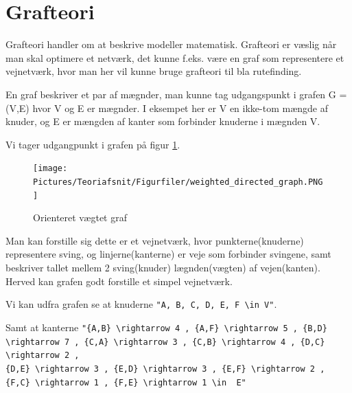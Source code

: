 \section{Grafteori}

Grafteori handler om at beskrive  modeller matematisk. Grafteori er væslig når man skal optimere et netværk, det kunne f.eks. være en graf som representere et vejnetværk, hvor man her vil kunne bruge grafteori til bla rutefinding.  

En graf beskriver et par af mægnder, man kunne tag udgangspunkt i grafen G = (V,E) hvor V og E er mægnder. I eksempet her er V en ikke-tom mængde af knuder, og E er mængden af kanter som forbinder knuderne i mægnden V. 

\vspace{5mm}

Vi tager udgangpunkt i grafen på figur \ref{fig:weighted-directed-graph}.

\begin{figure}[H]
\begin{adjustbox}{width=0.5\textwidth,center=\textwidth}
\centering
\texttt{[image: Pictures/Teoriafsnit/Figurfiler/weighted\_directed\_graph.PNG]}
\end{adjustbox}
\caption{Orienteret vægtet graf}
\label{fig:weighted-directed-graph}
\end{figure}

\vspace{5mm}

Man kan forstille sig dette er et vejnetværk, hvor punkterne(knuderne) representere sving, og linjerne(kanterne) er veje som forbinder svingene, samt beskriver tallet mellem 2 sving(knuder) lægnden(vægten) af vejen(kanten). Herved kan grafen godt forstille et simpel vejnetværk.

\vspace{5mm}

Vi kan udfra grafen se at knuderne \verb!"A, B, C, D, E, F \in V"!. 

\vspace{5mm}

Samt at kanterne \verb!"{A,B} \rightarrow 4 , {A,F} \rightarrow 5 , {B,D} \rightarrow 7 , {C,A} \rightarrow 3 , {C,B} \rightarrow 4 , {D,C} \rightarrow 2 ,! \\
\verb!{D,E} \rightarrow 3 , {E,D} \rightarrow 3 , {E,F} \rightarrow 2 , {F,C} \rightarrow 1 , {F,E} \rightarrow 1 \in  E"!

\vspace{5mm}

